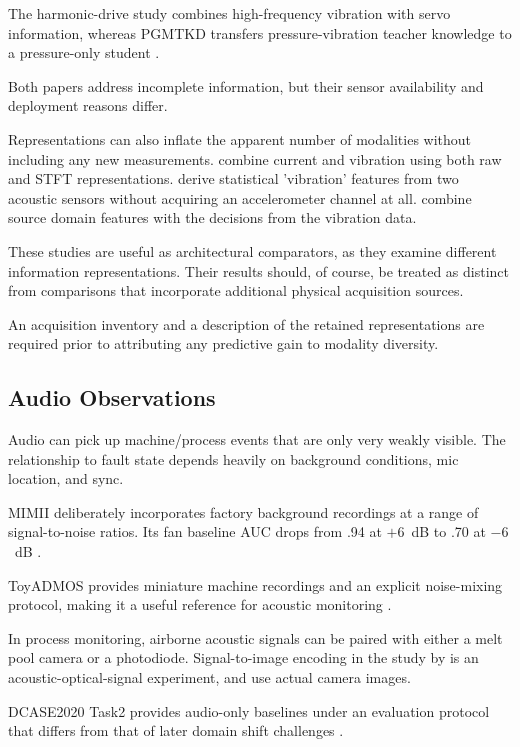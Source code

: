 The harmonic-drive study combines high-frequency vibration with servo information, whereas PGMTKD
transfers pressure-vibration teacher knowledge to a pressure-only student
\parencite{Yang2024Fault,Li2025PGMTKD}.

Both papers address incomplete information, but their sensor availability and deployment reasons
differ.

Representations can also inflate the apparent number of modalities without including any new
measurements. \textcite{Kullu2022A} combine current and vibration using both raw and STFT representations.
\textcite{Wan2024Pipeline} derive statistical 'vibration' features from two acoustic sensors
without acquiring an accelerometer channel at all. \textcite{Wang2025A} combine
source domain features with the decisions from the vibration data.

These studies are useful as architectural comparators, as they examine different information
representations. Their results should, of course, be treated as distinct from comparisons that
incorporate additional physical acquisition sources.

An acquisition inventory and a description of the retained representations are required prior to
attributing any predictive gain to modality diversity.

\subsection{Audio Observations}

Audio can pick up machine/process events that are only very weakly visible. The relationship to
fault state depends heavily on background conditions, mic location, and sync.

MIMII deliberately incorporates factory background recordings at a range of signal-to-noise ratios.
Its fan baseline AUC drops from .94 at $+6$~dB to .70 at $-6$~dB \parencite[Table~3]{Purohit2019MIMII}.

ToyADMOS provides miniature machine recordings and an explicit noise-mixing protocol, making it a
useful reference for acoustic monitoring \parencite{Koizumi2019ToyADMOS}.

In process monitoring, airborne acoustic signals can be paired with either a melt pool camera or a
photodiode. Signal-to-image encoding in the study by \textcite{Li2022A} is an acoustic-optical-signal experiment,
and \textcite{Xie2025Audiovisual} use actual camera images.

DCASE2020 Task2 provides audio-only baselines under an evaluation protocol that differs from that of
later domain shift challenges \parencite{Koizumi2020Description}.

